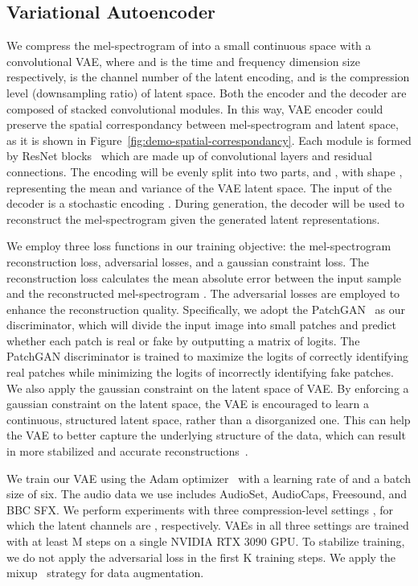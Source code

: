 \documentclass{article}
\begin{document}
\subsection{Variational Autoencoder}
\label{app:VAE}

We compress the mel-spectrogram  of  into a small continuous space  with a convolutional VAE, where  and  is the time and frequency dimension size respectively,  is the channel number of the latent encoding, and  is the compression level (downsampling ratio) of latent space. Both the encoder  and the decoder  are composed of stacked convolutional modules. In this way, VAE encoder could preserve the spatial correspondancy between mel-spectrogram and latent space, as it is shown in Figure~\ref{fig:demo-spatial-correspondancy}. Each module is formed by ResNet blocks~\cite{kong2021decoupling} which are made up of convolutional layers and residual connections. The encoding  will be evenly split into two parts,  and , with shape , representing the mean and variance of the VAE latent space. The input of the decoder is a stochastic encoding . During generation, the decoder will be used to reconstruct the mel-spectrogram given the generated latent representations.


We employ three loss functions in our training objective: the mel-spectrogram reconstruction loss, adversarial losses, and a gaussian constraint loss. The reconstruction loss calculates the mean absolute error between the input sample  and the reconstructed mel-spectrogram . The adversarial losses are employed to enhance the reconstruction quality. Specifically, we adopt the PatchGAN~\citep{isola2017image} as our discriminator, which will divide the input image into small patches and predict whether each patch is real or fake by outputting a matrix of logits. 
The PatchGAN discriminator is trained to maximize the logits of correctly identifying real patches while minimizing the logits of incorrectly identifying fake patches. We also apply the gaussian constraint on the latent space of VAE. By enforcing a gaussian constraint on the latent space, the VAE is encouraged to learn a continuous, structured latent space, rather than a disorganized one. This can help the VAE to better capture the underlying structure of the data, which can result in more stabilized and accurate reconstructions~\cite{kingma2013auto}. 


We train our VAE using the Adam optimizer~\cite{kingma2014adam} with a learning rate of  and a batch size of six. The audio data we use includes AudioSet, AudioCaps, Freesound, and BBC SFX. We perform experiments with three compression-level settings , for which the latent channels are , respectively.  VAEs in all three settings are trained with at least M steps on a single NVIDIA RTX 3090 GPU. To stabilize training, we do not apply the adversarial loss in the first K training steps. We apply the mixup~\cite{kong2020panns} strategy for data augmentation. 
\end{document}
